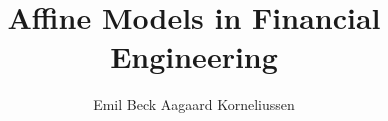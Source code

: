 \documentclass[a4paper,oneside,article,english]{memoir}
\title{Affine Models in Financial Engineering}
\author{Emil Beck Aagaard Korneliussen}
\begin{document}
\frontmatter

\newpage
\tableofcontents*

\mainmatter









\clearpage

\begin{refcontext}[sorting=nyt]
  \raggedyright[4em] \printbibliography

\end{refcontext}

 

\appendix

\end{document}
